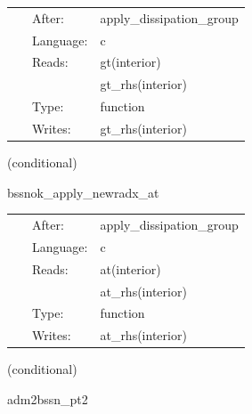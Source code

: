 

\hspace{5mm}

 \begin{tabular*}{160mm}{cll} 
~ & After:  & apply\_dissipation\_group \\ 
~ & Language:  & c \\ 
~ & Reads:  & gt(interior) \\ 
~& ~ &gt\_rhs(interior)\\ 
~ & Type:  & function \\ 
~ & Writes:  & gt\_rhs(interior) \\ 
\end{tabular*} 


\vspace{5mm}

   (conditional) 

\hspace{5mm} bssnok\_apply\_newradx\_at 



\hspace{5mm}

 \begin{tabular*}{160mm}{cll} 
~ & After:  & apply\_dissipation\_group \\ 
~ & Language:  & c \\ 
~ & Reads:  & at(interior) \\ 
~& ~ &at\_rhs(interior)\\ 
~ & Type:  & function \\ 
~ & Writes:  & at\_rhs(interior) \\ 
\end{tabular*} 


\vspace{5mm}

   (conditional) 

\hspace{5mm} adm2bssn\_pt2 

\hspace{5mm}{\it function `adm2bssn\_pt2` generated by einsteinengine. } 


\hspace{5mm}

